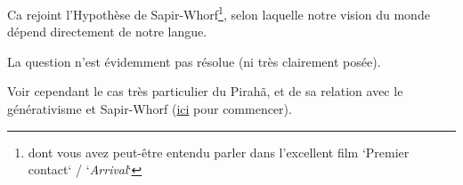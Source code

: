 \begin{frame}

Ca rejoint l'Hypothèse de Sapir-Whorf\footnote{dont vous avez peut-être entendu parler dans l'excellent film `Premier contact` / `\textit{Arrival}`}, selon laquelle notre vision du monde dépend directement de notre langue. \pause \newline

La question n'est évidemment pas résolue (ni très clairement posée). \pause \newline

Voir cependant le cas très particulier du Pirahã, et de sa relation avec le générativisme et Sapir-Whorf (\textcolor{blue}{\href{http://cpc.cx/khG}{ici}} pour commencer).

\end{frame}

